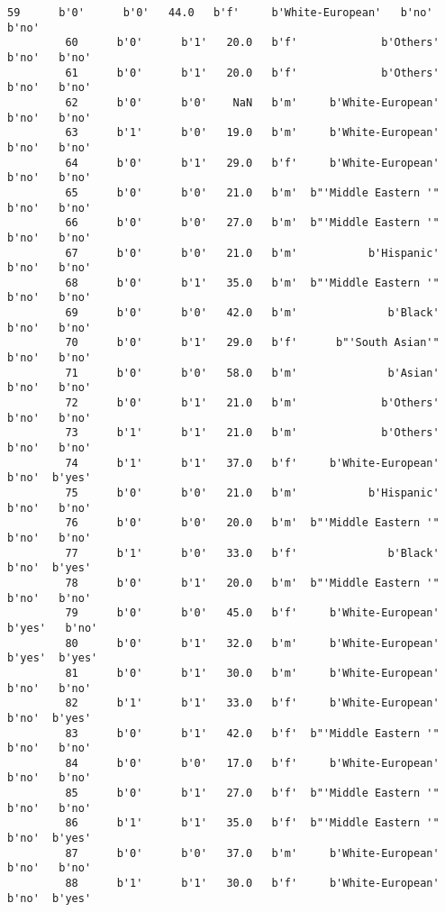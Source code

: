 \documentclass[11pt]{article}
\begin{document}
\begin{Verbatim}[commandchars=\\\{\}]
         59      b'0'      b'0'   44.0   b'f'     b'White-European'   b'no'   b'no'   
         60      b'0'      b'1'   20.0   b'f'             b'Others'   b'no'   b'no'   
         61      b'0'      b'1'   20.0   b'f'             b'Others'   b'no'   b'no'   
         62      b'0'      b'0'    NaN   b'm'     b'White-European'   b'no'   b'no'   
         63      b'1'      b'0'   19.0   b'm'     b'White-European'   b'no'   b'no'   
         64      b'0'      b'1'   29.0   b'f'     b'White-European'   b'no'   b'no'   
         65      b'0'      b'0'   21.0   b'm'  b"'Middle Eastern '"   b'no'   b'no'   
         66      b'0'      b'0'   27.0   b'm'  b"'Middle Eastern '"   b'no'   b'no'   
         67      b'0'      b'0'   21.0   b'm'           b'Hispanic'   b'no'   b'no'   
         68      b'0'      b'1'   35.0   b'm'  b"'Middle Eastern '"   b'no'   b'no'   
         69      b'0'      b'0'   42.0   b'm'              b'Black'   b'no'   b'no'   
         70      b'0'      b'1'   29.0   b'f'      b"'South Asian'"   b'no'   b'no'   
         71      b'0'      b'0'   58.0   b'm'              b'Asian'   b'no'   b'no'   
         72      b'0'      b'1'   21.0   b'm'             b'Others'   b'no'   b'no'   
         73      b'1'      b'1'   21.0   b'm'             b'Others'   b'no'   b'no'   
         74      b'1'      b'1'   37.0   b'f'     b'White-European'   b'no'  b'yes'   
         75      b'0'      b'0'   21.0   b'm'           b'Hispanic'   b'no'   b'no'   
         76      b'0'      b'0'   20.0   b'm'  b"'Middle Eastern '"   b'no'   b'no'   
         77      b'1'      b'0'   33.0   b'f'              b'Black'   b'no'  b'yes'   
         78      b'0'      b'1'   20.0   b'm'  b"'Middle Eastern '"   b'no'   b'no'   
         79      b'0'      b'0'   45.0   b'f'     b'White-European'  b'yes'   b'no'   
         80      b'0'      b'1'   32.0   b'm'     b'White-European'  b'yes'  b'yes'   
         81      b'0'      b'1'   30.0   b'm'     b'White-European'   b'no'   b'no'   
         82      b'1'      b'1'   33.0   b'f'     b'White-European'   b'no'  b'yes'   
         83      b'0'      b'1'   42.0   b'f'  b"'Middle Eastern '"   b'no'   b'no'   
         84      b'0'      b'0'   17.0   b'f'     b'White-European'   b'no'   b'no'   
         85      b'0'      b'1'   27.0   b'f'  b"'Middle Eastern '"   b'no'   b'no'   
         86      b'1'      b'1'   35.0   b'f'  b"'Middle Eastern '"   b'no'  b'yes'   
         87      b'0'      b'0'   37.0   b'm'     b'White-European'   b'no'   b'no'   
         88      b'1'      b'1'   30.0   b'f'     b'White-European'   b'no'  b'yes'   

\end{Verbatim}
\end{document}
